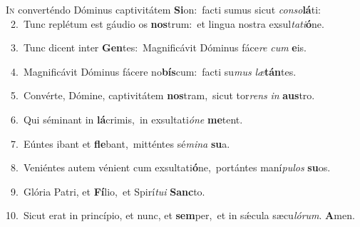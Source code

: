 \lettrine{\initial\textcolor{\initialcolor}{I}}{n} converténdo Dóminus captivitátem \textbf{Si}\-on:~\star facti sumus sicut \textit{con}\-\textit{so}\textbf{lá}ti:\\
{\numbfont\textcolor{\numbcolor}{~2.}}~Tunc replétum est gáudio os \textbf{nos}\-trum:~\star et lingua nostra exsul\-\textit{ta}\-\textit{ti}\textbf{ó}ne.\par
{\numbfont\textcolor{\numbcolor}{~3.}}~Tunc dicent inter \textbf{Gen}\-tes:~\star Magnificávit Dóminus fáce\textit{re} \textit{cum} \textbf{e}\-is.\par
{\numbfont\textcolor{\numbcolor}{~4.}}~Magnificávit Dóminus fácere no\-\textbf{bís}\-cum:~\star facti su\textit{mus} \textit{læ}\-\textbf{tán}tes.\par
{\numbfont\textcolor{\numbcolor}{~5.}}~Convérte, Dómine, captivitátem \textbf{nos}\-tram,~\star sicut tor\textit{rens} \textit{in} \textbf{aus}\-tro.\par
{\numbfont\textcolor{\numbcolor}{~6.}}~Qui séminant in \textbf{lá}\-crimis,~\star in exsultati\-\textit{ó}\-\textit{ne} \textbf{me}\-tent.\par
{\numbfont\textcolor{\numbcolor}{~7.}}~Eúntes ibant et \textbf{fle}\-bant,~\star mitténtes sé\-\textit{mi}\-\textit{na} \textbf{su}\-a.\par
{\numbfont\textcolor{\numbcolor}{~8.}}~Veniéntes autem vénient cum exsultati\-\textbf{ó}\-ne,~\star portántes maní\-\textit{pu}\-\textit{los} \textbf{su}\-os.\par
{\numbfont\textcolor{\numbcolor}{~9.}}~Glória Patri, et \textbf{Fí}\-lio,~\star et Spirí\-\textit{tu}\-\textit{i} \textbf{Sanc}\-to.\par
{\numbfont\textcolor{\numbcolor}{10.}}~Sicut erat in princípio, et nunc, et \textbf{sem}\-per,~\star et in sǽcula sæcu\-\textit{ló}\-\textit{rum}. \textbf{A}\-men.\par

